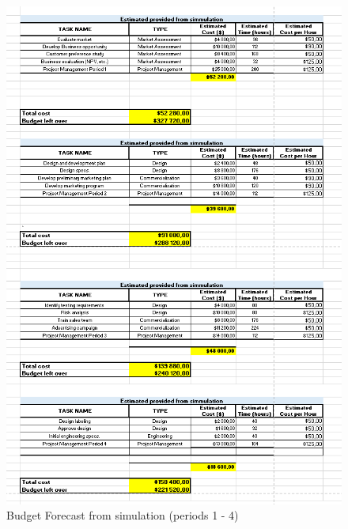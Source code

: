 \begin{appendices}
\begin{figure}[H]
\includegraphics[scale=0.75]{forecast/budget_forecast_sim_1234.PNG}
\caption{Budget Forecast from simulation (periods 1 - 4)}
\end{figure}
\begin{figure}[H]

\end{figure}
\end{appendices}
